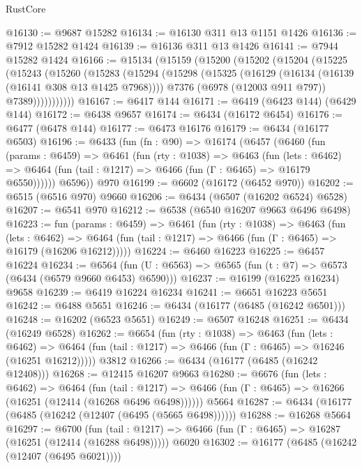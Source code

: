 \begin{lexlean}{RustCore}
\begin{coremodule}
@16130 := @9687 @15282
@16134 := @16130 @311 @13 @1151 @1426
@16136 := @7912 @15282 @1424
@16139 := @16136 @311 @13 @1426
@16141 := @7944 @15282 @1424
@16166 := @15134
    (@15159
      (@15200
        (@15202
          (@15204
            (@15225
              (@15243
                (@15260
                  (@15283
                    (@15294
                      (@15298
                        (@15325
                          (@16129 (@16134 (@16139 (@16141 @308 @13 @1425 @7968))))
                          @7376
                          (@6978 (@12003 @911 @797))
                          @7389)))))))))))
@16167 := @6417 @144
@16171 := @6419 (@6423 @144) (@6429 @144)
@16172 := @6438 @9657
@16174 := @6434 (@16172 @6454)
@16176 := @6477 (@6478 @144)
@16177 := @6473 @16176
@16179 := @6434 (@16177 @6503)
@16196 := @6433
    (fun (fn : @90) =>
    @16174
      (@6457
        (@6460
          (fun (params : @6459) =>
          @6461
            (fun (rty : @1038) =>
            @6463
              (fun (lets : @6462) =>
              @6464 (fun (tail : @1217) => @6466 (fun (Γ : @6465) => @16179 @6550))))))
        @6596))
    @970
@16199 := @6602 (@16172 (@6452 @970))
@16202 := @6515 (@6516 @970) @9660
@16206 := @6434 (@6507 (@16202 @6524) @6528)
@16207 := @6541 @970
@16212 := @6538 (@6540 @16207 @9663 @6496 @6498)
@16223 := fun (params : @6459) =>
  @6461
    (fun (rty : @1038) =>
    @6463
      (fun (lets : @6462) =>
      @6464 (fun (tail : @1217) => @6466 (fun (Γ : @6465) => @16179 (@16206 @16212)))))
@16224 := @6460 @16223
@16225 := @6457 @16224
@16234 := @6564 (fun (U : @6563) => @6565 (fun (t : @7) => @6573 (@6434 (@6579 @9660 @6453) @6590)))
@16237 := @16199 (@16225 @16234) @9658
@16239 := @6419 @16224 @16234
@16241 := @6651 @16223 @5651
@16242 := @6488 @5651
@16246 := @6434 (@16177 (@6485 (@16242 @6501)))
@16248 := @16202 (@6523 @5651)
@16249 := @6507 @16248
@16251 := @6434 (@16249 @6528)
@16262 := @6654
    (fun (rty : @1038) =>
    @6463
      (fun (lets : @6462) =>
      @6464 (fun (tail : @1217) => @6466 (fun (Γ : @6465) => @16246 (@16251 @16212)))))
    @3812
@16266 := @6434 (@16177 (@6485 (@16242 @12408)))
@16268 := @12415 @16207 @9663
@16280 := @6676
    (fun (lets : @6462) =>
    @6464
      (fun (tail : @1217) =>
      @6466 (fun (Γ : @6465) => @16266 (@16251 (@12414 (@16268 @6496 @6498))))))
    @5664
@16287 := @6434 (@16177 (@6485 (@16242 (@12407 (@6495 (@5665 @6498))))))
@16288 := @16268 @5664
@16297 := @6700
    (fun (tail : @1217) => @6466 (fun (Γ : @6465) => @16287 (@16251 (@12414 (@16288 @6498)))))
    @6020
@16302 := @16177 (@6485 (@16242 (@12407 (@6495 @6021))))

\end{coremodule}
\end{lexlean}
